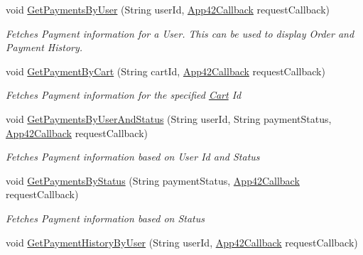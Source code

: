 \begin{DoxyCompactItemize}
void \hyperlink{classcom_1_1shephertz_1_1app42_1_1paas_1_1sdk_1_1windows_1_1shopping_1_1_cart_service_ababfdc079add838412001ac365778d10}{Get\+Payments\+By\+User} (String user\+Id, \hyperlink{interfacecom_1_1shephertz_1_1app42_1_1paas_1_1sdk_1_1windows_1_1_app42_callback}{App42\+Callback} request\+Callback)
\begin{DoxyCompactList}\small\item\em Fetches Payment information for a User. This can be used to display Order and Payment History. \end{DoxyCompactList}\item 
void \hyperlink{classcom_1_1shephertz_1_1app42_1_1paas_1_1sdk_1_1windows_1_1shopping_1_1_cart_service_ae37be2f485b30b0489258f4410ddfdc1}{Get\+Payment\+By\+Cart} (String cart\+Id, \hyperlink{interfacecom_1_1shephertz_1_1app42_1_1paas_1_1sdk_1_1windows_1_1_app42_callback}{App42\+Callback} request\+Callback)
\begin{DoxyCompactList}\small\item\em Fetches Payment information for the specified \hyperlink{classcom_1_1shephertz_1_1app42_1_1paas_1_1sdk_1_1windows_1_1shopping_1_1_cart}{Cart} Id \end{DoxyCompactList}\item 
void \hyperlink{classcom_1_1shephertz_1_1app42_1_1paas_1_1sdk_1_1windows_1_1shopping_1_1_cart_service_af2791d7436b2564551e61352632ecdd3}{Get\+Payments\+By\+User\+And\+Status} (String user\+Id, String payment\+Status, \hyperlink{interfacecom_1_1shephertz_1_1app42_1_1paas_1_1sdk_1_1windows_1_1_app42_callback}{App42\+Callback} request\+Callback)
\begin{DoxyCompactList}\small\item\em Fetches Payment information based on User Id and Status \end{DoxyCompactList}\item 
void \hyperlink{classcom_1_1shephertz_1_1app42_1_1paas_1_1sdk_1_1windows_1_1shopping_1_1_cart_service_a51545e25f09e313a778f3f8af2e60206}{Get\+Payments\+By\+Status} (String payment\+Status, \hyperlink{interfacecom_1_1shephertz_1_1app42_1_1paas_1_1sdk_1_1windows_1_1_app42_callback}{App42\+Callback} request\+Callback)
\begin{DoxyCompactList}\small\item\em Fetches Payment information based on Status \end{DoxyCompactList}\item 
void \hyperlink{classcom_1_1shephertz_1_1app42_1_1paas_1_1sdk_1_1windows_1_1shopping_1_1_cart_service_aa834484c12289ee85a8bbe7973f9eac6}{Get\+Payment\+History\+By\+User} (String user\+Id, \hyperlink{interfacecom_1_1shephertz_1_1app42_1_1paas_1_1sdk_1_1windows_1_1_app42_callback}{App42\+Callback} request\+Callback)

\end{DoxyCompactItemize}
